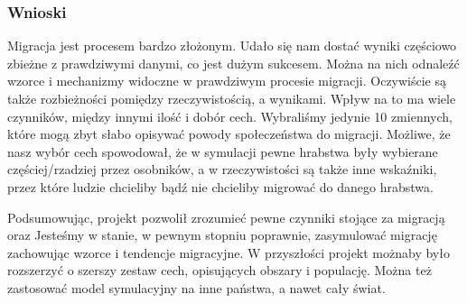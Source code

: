 \documentclass[a4paper,12pt]{article}
\begin{document}
\subsubsection*{Wnioski}
Migracja jest procesem bardzo złożonym. Udało się nam dostać wyniki częściowo zbieżne z prawdziwymi danymi, co jest dużym sukcesem. Można na nich odnaleźć wzorce i mechanizmy widoczne w prawdziwym procesie migracji. Oczywiście są także rozbieżności pomiędzy rzeczywistością, a wynikami. Wpływ na to ma wiele czynników, między innymi ilość i dobór cech. Wybraliśmy jedynie 10 zmiennych, które mogą zbyt słabo opisywać powody społeczeństwa do migracji. Możliwe, że nasz wybór cech spowodował, że w symulacji pewne hrabstwa były wybierane częściej/rzadziej przez osobników, a w rzeczywistości są także inne wskaźniki, przez które ludzie chcieliby bądź nie chcieliby migrować do danego hrabstwa.     

Podsumowując, projekt pozwolił zrozumieć pewne czynniki stojące za migracją oraz 
Jesteśmy w stanie, w pewnym stopniu poprawnie, zasymulować migrację zachowując wzorce i tendencje migracyjne. W przyszłości projekt możnaby było rozszerzyć o szerszy zestaw cech, opisujących obszary i populację. Można też zastosować model symulacyjny na inne państwa, a nawet cały świat. 

\newpage
\printbibliography[title=Bibliografia]
\end{document}
